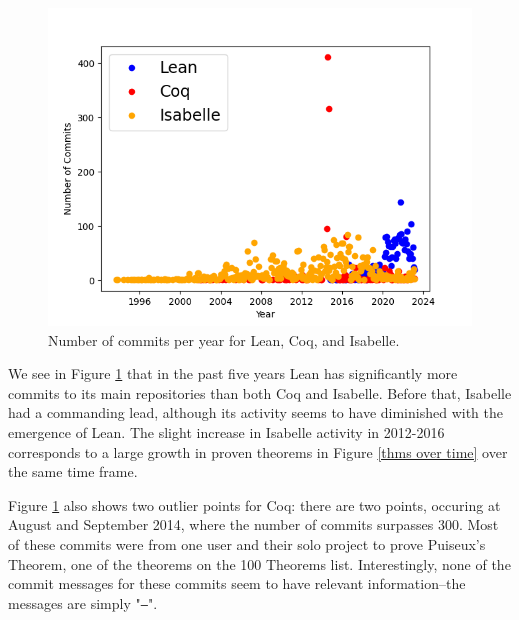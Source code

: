 \documentclass[sigconf,nonacm]{acmart}
\begin{document}
\begin{figure}[H]
  \includegraphics[scale=0.5]{compare_commits.png}
  \caption{Number of commits per year for Lean, Coq, and Isabelle.}
  \label{commits per year}
\end{figure}

We see in Figure \ref{commits per year} that in the past five years Lean has significantly more commits to its main repositories than both Coq and Isabelle. Before that, Isabelle had a commanding lead, although its activity seems to have diminished with the emergence of Lean. The slight increase in Isabelle activity in 2012-2016 corresponds to a large growth in proven theorems in Figure \ref{thms over time} over the same time frame.

Figure \ref{commits per year} also shows two outlier points for Coq: there are two points, occuring at August and September 2014, where the number of commits surpasses 300. Most of these commits were from one user and their solo project to prove Puiseux's Theorem, one of the theorems on the 100 Theorems list. Interestingly, none of the commit messages for these commits seem to have relevant information--the messages are simply "\texttt{--}".
\end{document}
